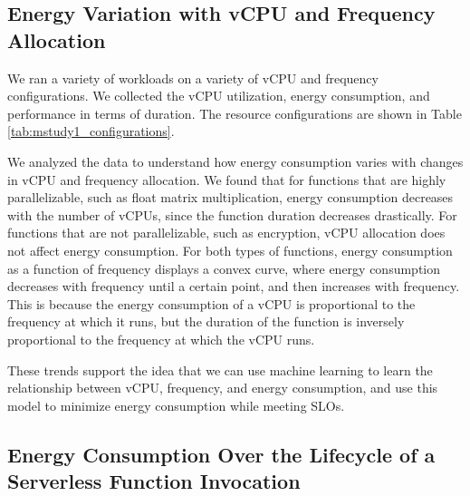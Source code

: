 \documentclass[times, 10pt,twocolumn]{article}
\begin{document}
\subsection{Energy Variation with vCPU and Frequency Allocation}

We ran a variety of workloads on a variety of vCPU and frequency configurations. We collected the vCPU utilization, energy consumption, and performance in terms of duration. The resource configurations are shown in Table \ref{tab:mstudy1_configurations}.

We analyzed the data to understand how energy consumption varies with changes in vCPU and frequency allocation. We found that for functions that are highly parallelizable, such as float matrix multiplication, energy consumption decreases with the number of vCPUs, since the function duration decreases drastically. For functions that are not parallelizable, such as encryption, vCPU allocation does not affect energy consumption. For both types of functions, energy consumption as a function of frequency displays a convex curve, where energy consumption decreases with frequency until a certain point, and then increases with frequency. This is because the energy consumption of a vCPU is proportional to the frequency at which it runs, but the duration of the function is inversely proportional to the frequency at which the vCPU runs.

These trends support the idea that we can use machine learning to learn the relationship between vCPU, frequency, and energy consumption, and use this model to minimize energy consumption while meeting SLOs.

\subsection{Energy Consumption Over the Lifecycle of a Serverless Function Invocation}





\end{document}
